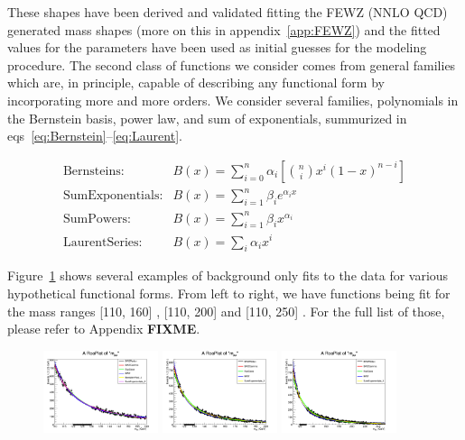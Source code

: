 These shapes have been derived and validated fitting the FEWZ (NNLO QCD) generated mass shapes (more on this in appendix~\ref{app:FEWZ}) and the fitted values for the parameters have been used as initial guesses for the modeling procedure.
The second class of functions we consider comes from general families which are, in principle, capable of describing any functional form by incorporating more and more orders.
We consider several families, polynomials in the Bernstein basis, power law, and sum of exponentials, summurized in eqs~\ref{eq:Bernstein}--\ref{eq:Laurent}.

\begin{align}
        \label{eq:Bernstein}
        \text{Bernsteins:}& {B(x)} = {\sum_{i=0}^{n} \alpha_i[\binom{n}{i}x^{i}(1-x)^{n-i}]} \\
        \label{eq:SumExponentials}
        \text{SumExponentials:}& {B(x)} = {\sum_{i=1}^{n} \beta_{i}e^{\alpha_{i}x}}\\
        \label{eq:SumPowers}
        \text{SumPowers:}& {B(x)} = {\sum_{i=1}^{n} \beta_{i}x^{\alpha_{i}}}\\
        \label{eq:Laurent}
        \text{LaurentSeries:}& {B(x)} = {\sum_{i} \alpha_{i}x^{i}}
\end{align}

Figure~\ref{bkgmodel:exampleModels} shows several examples of background only fits to the data for various hypothetical functional forms. From left to right, we have functions being fit for the mass ranges [110, 160] \gev, [110, 200] \gev and [110, 250] \gev. For the full list of those, please refer to Appendix \textbf{FIXME}.

\begin{figure}[hbp]
     \centering
     \includegraphics[width=0.3\textwidth]{figures/background_model/baseline_p25GeV_110to160/backgroundFits__01JetsTightBB__bkgModels.png}
     \includegraphics[width=0.3\textwidth]{figures/background_model/baseline_p25GeV_110to200/backgroundFits__01JetsTightBB__bkgModels.png}
     \includegraphics[width=0.3\textwidth]{figures/background_model/baseline_p25GeV_110to250/backgroundFits__01JetsTightBB__bkgModels.png}
     \caption{}
     \label{bkgmodel:exampleModels}
 \end{figure}

